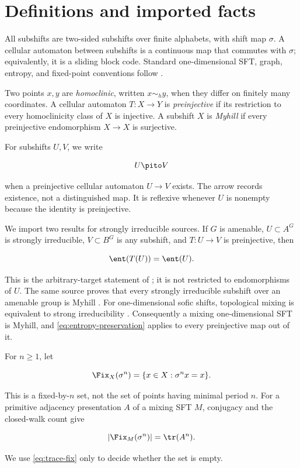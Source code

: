 \section{Definitions and imported facts}
\label{sec:preliminaries}

All subshifts are two-sided subshifts over finite alphabets, with shift map
$\sigma$.  A cellular automaton between subshifts is a continuous map that
commutes with $\sigma$; equivalently, it is a sliding block code.  Standard
one-dimensional SFT, graph, entropy, and fixed-point conventions follow
\cite{lindMarcus2021}.

Two points $x,y$ are \emph{homoclinic}, written $x\sim_h y$, when they differ
on finitely many coordinates.  A cellular automaton $T:X\to Y$ is
\emph{preinjective} if its restriction to every homoclinicity class of $X$ is
injective.  A subshift $X$ is \emph{Myhill} if every preinjective endomorphism
$X\to X$ is surjective.

For subshifts $U,V$, we write

\begin{equation}
  U\pito V
  \label{eq:pi-arrow}
\end{equation}

when a preinjective cellular automaton $U\to V$ exists.  The arrow records
existence, not a distinguished map.  It is reflexive whenever $U$ is nonempty
because the identity is preinjective.

We import two results for strongly irreducible sources.  If $G$ is amenable,
$U\subset A^G$ is strongly irreducible, $V\subset B^G$ is any subshift, and
$T:U\to V$ is preinjective, then

\begin{equation}
  \ent(T(U))=\ent(U).
  \label{eq:entropy-preservation}
\end{equation}

This is the arbitrary-target statement of
\cite[Theorem~5.1]{ceccheriniCoornaert2012}; it is not restricted to
endomorphisms of $U$.  The same source proves that every strongly irreducible
subshift over an amenable group is Myhill
\cite[Theorem~1.1]{ceccheriniCoornaert2012}.  For one-dimensional sofic
shifts, topological mixing is equivalent to strong irreducibility
\cite[Corollary~1.3]{ceccheriniCoornaert2012}.  Consequently a mixing
one-dimensional SFT is Myhill, and \eqref{eq:entropy-preservation} applies to
every preinjective map out of it.

For $n\geq1$, let

\[
  \Fix_X(\sigma^n)=\{x\in X:\sigma^n x=x\}.
\]

This is a fixed-by-$n$ set, not the set of points having minimal period $n$.
For a primitive adjacency presentation $A$ of a mixing SFT $M$, conjugacy and
the closed-walk count give

\begin{equation}
  |\Fix_M(\sigma^n)|=\tr(A^n).
  \label{eq:trace-fix}
\end{equation}

We use \eqref{eq:trace-fix} only to decide whether the set is empty.

